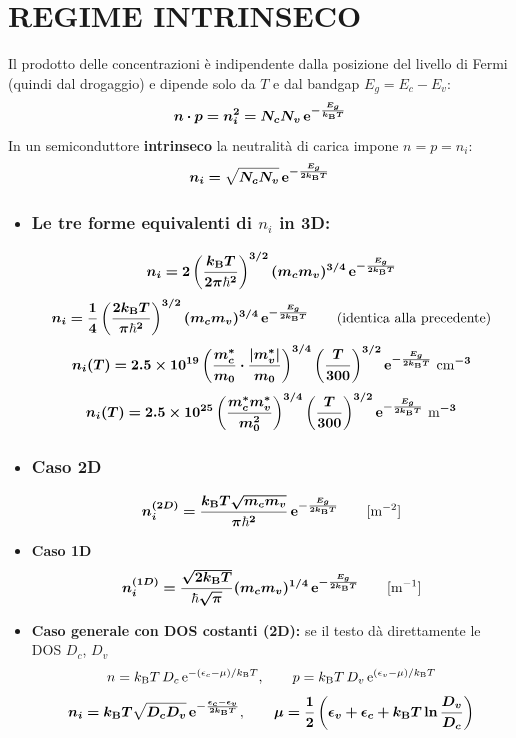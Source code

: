 \section{REGIME INTRINSECO}
Il prodotto delle concentrazioni è indipendente dalla posizione del livello di Fermi (quindi dal drogaggio) e dipende solo da $T$ e dal bandgap $E_g=E_c-E_v$:
\[ \bm{n\cdot p = n_i^2 = N_cN_v\,\mathrm{e}^{-\frac{E_g}{k_{\mathrm{B}} T}}} \]
In un semiconduttore \textbf{intrinseco} la neutralità di carica impone $n=p=n_i$:
\[ \bm{n_i = \sqrt{N_cN_v}\,\mathrm{e}^{-\frac{E_g}{2k_{\mathrm{B}} T}}} \]

\begin{itemize}
    \item \subsubsection*{Le tre forme equivalenti di $n_i$ in 3D:}
\[ \bm{n_i = 2\left(\frac{k_{\mathrm{B}} T}{2\pi\hbar^2}\right)^{3/2}(m_c m_v)^{3/4}\,\mathrm{e}^{-\frac{E_g}{2k_{\mathrm{B}} T}}} \]
\[ \bm{n_i = \frac14\left(\frac{2k_{\mathrm{B}} T}{\pi\hbar^2}\right)^{3/2}(m_cm_v)^{3/4}\,\mathrm{e}^{-\frac{E_g}{2k_{\mathrm{B}} T}}} \qquad\text{(identica alla precedente)} \]
\[ \bm{n_i(T) = 2.5\times10^{19}\left(\frac{m_c^*}{m_0}\cdot\frac{|m_v^*|}{m_0}\right)^{3/4}\left(\frac{T}{300}\right)^{3/2}\mathrm{e}^{-\frac{E_g}{2k_{\mathrm{B}} T}}\ \text{cm}^{-3}} \]
\[ \bm{n_i(T) = 2.5\times10^{25}\left(\frac{m_c^*m_v^*}{m_0^2}\right)^{3/4}\left(\frac{T}{300}\right)^{3/2}\mathrm{e}^{-\frac{E_g}{2k_{\mathrm{B}} T}}\ \text{m}^{-3}} \]

\item \subsubsection*{Caso 2D}
\[ \bm{n_i^{(2D)} = \frac{k_{\mathrm{B}} T\sqrt{m_cm_v}}{\pi\hbar^2}\,\mathrm{e}^{-\frac{E_g}{2k_{\mathrm{B}} T}}} \qquad [\text{m}^{-2}] \]
\item \textbf{Caso 1D}
\[ \bm{n_i^{(1D)} = \frac{\sqrt{2k_{\mathrm{B}} T}}{\hbar\sqrt\pi}(m_cm_v)^{1/4}\,\mathrm{e}^{-\frac{E_g}{2k_{\mathrm{B}} T}}} \qquad [\text{m}^{-1}] \]
\item \textbf{Caso generale con DOS costanti (2D):} se il testo dà direttamente le DOS $D_c$, $D_v$
\[ n = k_{\mathrm{B}} T\,D_c\,\mathrm{e}^{-(\epsilon_c-\mu)/k_{\mathrm{B}} T}, \qquad p = k_{\mathrm{B}} T\,D_v\,\mathrm{e}^{(\epsilon_v-\mu)/k_{\mathrm{B}} T} \]
\[ \bm{n_i = k_{\mathrm{B}} T\sqrt{D_cD_v}\,\mathrm{e}^{-\frac{\epsilon_c-\epsilon_v}{2k_{\mathrm{B}} T}}}, \qquad
   \bm{\mu = \frac12\left(\epsilon_v+\epsilon_c+k_{\mathrm{B}} T\ln\frac{D_v}{D_c}\right)} \]
\end{itemize}

